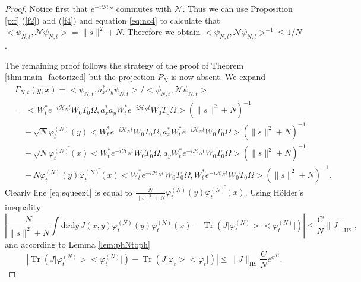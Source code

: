 \documentclass[11pt,a4paper,DIV11]{scrartcl}	%
\newcommand{\di}{\textrm{d}}		%
\newcommand{\Ncal}{\mathcal{N}}		%
\newcommand{\Hcal}{\mathcal{H}}		%
\newcommand{\scal}[2]{\big<#1,#2\big>} %
\newcommand{\cc}[1]{\overline{#1}}	%
\newcommand{\norm}[1]{\lVert#1\rVert}	%
\newcommand{\ph}{\varphi_t^{(N)}}	%
\newcommand{\project}[1]{\lvert #1 \big>\big< #1\rvert}	%
\newcommand{\Tr}{\operatorname{Tr}}	%
\newcommand{\HS}{_{\textrm{HS}}}
\newcommand{\bd}{\begin{displaymath}}			%
\newcommand{\ed}{\end{displaymath}}
\newcommand{\eqr}[1]{\eqref{eq:#1}}			%
\begin{document}
\begin{proof} Notice first that $e^{-it \Hcal_N}$ commutes with $\Ncal$. Thus we can use Proposition \ref{p:f} (\ref{f2}) and (\ref{f4}) and equation \eqr{no4} to calculate that $\scal{\psi_{N,t}}{\Ncal \psi_{N,t}} = \norm{s}^2 + N$. Therefore we obtain $\scal{\psi_{N,t}}{\Ncal \psi_{N,t}}^{-1} \leq 1/N$.

The remaining proof follows the strategy of the proof of Theorem \ref{thm:main_factorized} but the projection $P_N$ is now absent. We expand
\begin{align}
& \Gamma_{N,t}(y;x) = \scal{\psi_{N,t}}{a^\ast_x a_y \psi_{N,t}}/\scal{\psi_{N,t}}{\Ncal \psi_{N,t}} \nonumber \\
& = \scal{W^\ast_t e^{-i \Hcal_N t} W_0 T_0 \Omega}{a^\ast_x a_y W^\ast_t e^{-i\Hcal_N t} W_0 T_0 \Omega}\left(\norm{s}^2 + N\right)^{-1} \label{eq:squeez1} \\
& \quad + \sqrt{N} \ph(y) \scal{W^\ast_t e^{-i\Hcal_N t} W_0 T_0 \Omega}{a^\ast_x W^\ast_t e^{-i \Hcal_N t} W_0 T_0 \Omega}\left(\norm{s}^2 + N\right)^{-1} \label{eq:squeez3}\\
& \quad + \sqrt{N} \cc{\ph(x)} \scal{W^\ast_t e^{-i\Hcal_N t} W_0 T_0 \Omega}{a_y W^\ast_t e^{-i \Hcal_N t} W_0 T_0 \Omega} \left(\norm{s}^2 + N\right)^{-1} \label{eq:squeez2}\\
& \quad + N \ph(y) \cc{\ph(x)} \scal{W^\ast_t e^{-i\Hcal_N t} W_0 T_0 \Omega}{W^\ast_t e^{-i\Hcal_N t} W_0 T_0 \Omega}\left(\norm{s}^2 + N\right)^{-1}. \label{eq:squeez4}
\end{align}
Clearly line \eqref{eq:squeez4} is equal to $\frac{N}{\norm{s}^2+N} \ph(y) \cc{\ph(x)}$. Using H\"older's inequality
\[
\left\lvert \frac{N}{\norm{s}^2+N} \int \di x \di y\, J(x,y) \ph(y) \cc{\ph(x)} - \Tr\left( J \project{\ph}  \right) \right\rvert \leq \frac{C}{N} \norm{J}\HS,
\]
and according to Lemma \ref{lem:phNtoph}
\bd
\left\lvert \Tr\left(J \project{\ph}\right) - \Tr\left(J \project{\varphi_t}\right) \right\rvert \leq \norm{J}_{\textrm{HS}} \frac{C}{N} e^{e^{Kt}}.
\ed


\end{proof}
\end{document}
